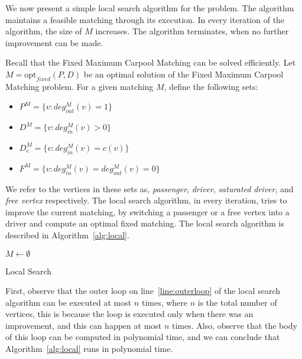 \documentclass[]{llncs}
\def\N{\mathbb{N}}
\newcommand{\din}[1][M]{deg^M_{in}}
\newcommand{\dout}[1][M]{deg^M_{out}}
\def\FIXEDCARPOOL{Fixed Maximum Carpool Matching}
\begin{document}
We now present a simple local search algorithm for the problem. 
The algorithm maintains a feasible matching through its execution.
In every iteration of the algorithm, the size of $M$ increases.
The algorithm terminates, when no further improvement can be made. 

Recall that the \FIXEDCARPOOL{} can be solved efficiently.
Let $M = \text{opt}_{fixed}(P, D)$ be an optimal solution of the
\FIXEDCARPOOL{} problem.
%
For a given matching $M$, define the following sets:
\begin{itemize}
\item $P^M = \{v : \dout(v) = 1\}$
\item $D^M = \{v : \din(v) > 0\}$
\item $D^M_c = \{v : \din(v) = c(v)\}$
\item $F^M = \{v : \din(v) = \dout(v) = 0\}$ 
\end{itemize}
We refer to the vertices in these sets as, \emph{passenger}, 
\emph{driver}, \emph{saturated driver}, and \emph{free vertex} respectively.
The local search algorithm, in every iteration, 
tries to improve the current matching, 
by switching a passenger or a free vertex into a driver 
and compute an optimal fixed matching.
The local search algorithm is described in
Algorithm~\ref{alg:local}.

\begin{algorithm}
\KwIn{$G = (V, A)$, $c : V \rightarrow \N$}
$M \leftarrow \emptyset$					\\

\caption{
\label{alg:local}
Local Search}
\end{algorithm}

First, observe that the outer loop on line~\ref{line:outerloop} of the local search algorithm
can be executed at most $n$ times, 
where $n$ is the total number of vertices, 
this is because the loop is executed only when there was an improvement, 
and this can happen at most $n$ times.
Also, observe that the body of this loop can be computed in polynomial time, 
and we can conclude that Algorithm~\ref{alg:local} runs in polynomial time.
    
\end{document}
